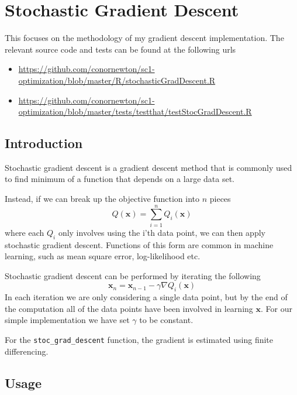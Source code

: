 \documentclass[12pt,]{article}
\providecommand{\tightlist}{%
  \setlength{\itemsep}{0pt}\setlength{\parskip}{0pt}}
\begin{document}
\hypertarget{stochastic-gradient-descent}{%
\section{Stochastic Gradient
Descent}\label{stochastic-gradient-descent}}

This focuses on the methodology of my gradient descent implementation.
The relevant source code and tests can be found at the following urls

\begin{itemize}
\tightlist
\item
  \url{https://github.com/conornewton/sc1-optimization/blob/master/R/stochasticGradDescent.R}
\item
  \url{https://github.com/conornewton/sc1-optimization/blob/master/tests/testthat/testStocGradDescent.R}
\end{itemize}

\hypertarget{introduction-1}{%
\subsection{Introduction}\label{introduction-1}}

Stochastic gradient descent is a gradient descent method that is
commonly used to find minimum of a function that depends on a large data
set.

Instead, if we can break up the objective function into \(n\) pieces \[
Q(\mathbf{x}) = \sum_{i=1}^nQ_i(\mathbf{x})
\] where each \(Q_i\) only involves using the i'th data point, we can
then apply stochastic gradient descent. Functions of this form are
common in machine learning, such as mean square error, log-likelihood
etc.

Stochastic gradient descent can be performed by iterating the following
\[
    \mathbf{x}_{n} = \mathbf{x}_{n-1} - \gamma \nabla Q_i(\mathbf{x})
\] In each iteration we are only considering a single data point, but by
the end of the computation all of the data points have been involved in
learning \(\mathbf{x}\). For our simple implementation we have set
\(\gamma\) to be constant.

For the \texttt{stoc\_grad\_descent} function, the gradient is estimated
using finite differencing.

\hypertarget{usage-1}{%
\subsection{Usage}\label{usage-1}}
\end{document}
